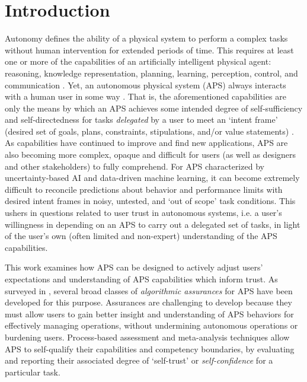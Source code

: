 \section{Introduction}
Autonomy defines the ability of a physical system to perform a complex tasks without human intervention for extended periods of time. This requires at least one or more of the capabilities of an artificially intelligent physical agent: reasoning, knowledge representation, planning, learning, perception, control, and communication \cite{Israelsen2019-to}. 
Yet, an autonomous physical system (APS) always interacts with a human user in some way \cite{Bradshaw2013-ck}.  That is, the aforementioned capabilities are only the means by which an APS achieves some intended degree of self-sufficiency and self-directedness for tasks \emph{delegated} by a user to meet an `intent frame' (desired set of goals, plans, constraints, stipulations, and/or value statements) \cite{Miller2014-av}. 
As capabilities have continued to improve and find new applications, APS are also becoming more complex, opaque and difficult for users (as well as designers and other stakeholders) to fully comprehend. For APS characterized by uncertainty-based AI and data-driven machine learning, it can become extremely difficult to reconcile predictions about behavior and performance limits with desired intent frames in noisy, untested, and `out of scope' task conditions. This ushers in questions related to user trust in autonomous systems, i.e. a user's willingness in depending on an APS to carry out a delegated set of tasks, in light of the user's own (often limited and non-expert) understanding of the APS capabilities. 

This work examines how APS can be designed to actively adjust users' expectations and understanding of APS capabilities which inform trust. As surveyed in \cite{Israelsen2019-to}, several broad classes of \emph{algorithmic assurances} for APS have been developed for this purpose. 
Assurances are challenging to develop because they must allow users to gain better insight and understanding of APS behaviors for effectively managing operations, without undermining autonomous operations or burdening users. 
Process-based assessment and meta-analysis techniques allow APS to self-qualify their capabilities and competency boundaries, by evaluating and reporting their associated degree of `self-trust' or \emph{self-confidence} for a particular task. 

